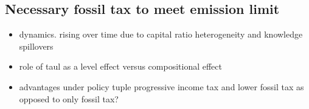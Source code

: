  \subsection{Necessary fossil tax to meet emission limit}
 \begin{itemize}
 	\item dynamics. rising over time due to capital ratio heterogeneity and knowledge spillovers
 	\item role of taul as a level effect versus compositional effect
 	\item advantages under policy tuple progressive income tax and lower fossil tax as opposed to only fossil tax?
 \end{itemize}
